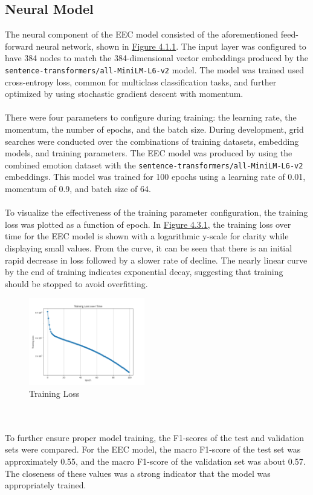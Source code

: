 \documentclass[11pt]{article}
\begin{document}
\subsection{Neural Model}
The neural component of the EEC model consisted of the aforementioned feed-forward neural network, shown in  \hyperref[fig:eec_architecture]{Figure 4.1.1}. The input layer was configured to have 384 nodes to match the 384-dimensional vector embeddings produced by the \texttt{sentence-transformers/all-MiniLM-L6-v2} model. The model was trained used cross-entropy loss, common for multiclass classification tasks, and further optimized by using stochastic gradient descent with momentum. \\ \\
There were four parameters to configure during training: the learning rate, the momentum, the number of epochs, and the batch size. During development, grid searches were conducted over the combinations of training datasets, embedding models, and training parameters. The EEC model was produced by using the combined emotion dataset with the \texttt{sentence-transformers/all-MiniLM-L6-v2} embeddings. This model was trained for 100 epochs using a learning rate of 0.01, momentum of 0.9, and batch size of 64. \\ \\
To visualize the effectiveness of the training parameter configuration, the training loss was plotted as a function of epoch. In \hyperref[fig:training_loss]{Figure 4.3.1}, the training loss over time for the EEC model is shown with a logarithmic y-scale for clarity while displaying small values. From the curve, it can be seen that there is an initial rapid decrease in loss followed by a slower rate of decline. The nearly linear curve by the end of training indicates exponential decay, suggesting that training should be stopped to avoid overfitting.
\renewcommand{\thefigure}{4.3.1}
\begin{figure}[h]
	\centering
	\includegraphics[width=0.45\textwidth]{training_loss.png}
	\caption{Training Loss}
	\label{fig:training_loss}
\end{figure}
\\ \\ To further ensure proper model training, the F1-scores of the test and validation sets were compared. For the EEC model, the macro F1-score of the test set was approximately 0.55, and the macro F1-score of the validation set was about 0.57. The closeness of these values was a strong indicator that the model was appropriately trained.
\end{document}
